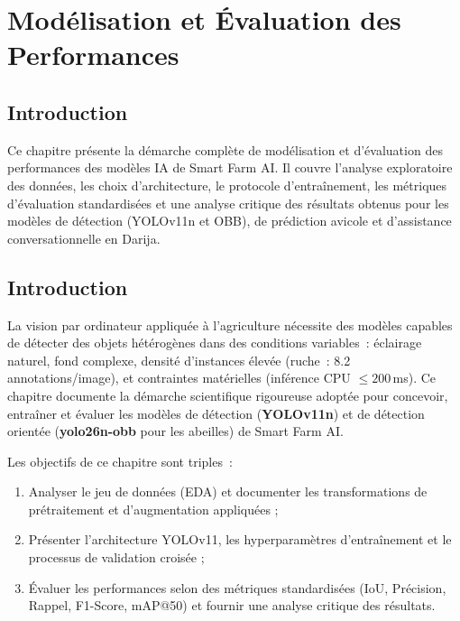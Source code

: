 \chapter{Modélisation et Évaluation des Performances}

\section*{Introduction}

Ce chapitre présente la démarche complète de modélisation et d'évaluation des
performances des modèles IA de Smart Farm AI. Il couvre l'analyse exploratoire
des données, les choix d'architecture, le protocole d'entraînement, les métriques
d'évaluation standardisées et une analyse critique des résultats obtenus pour
les modèles de détection (YOLOv11n et OBB), de prédiction avicole et d'assistance
conversationnelle en Darija.

\section{Introduction}

La vision par ordinateur appliquée à l'agriculture nécessite des modèles capables
de détecter des objets hétérogènes dans des conditions variables~:
éclairage naturel, fond complexe, densité d'instances élevée (ruche~: 8.2 annotations/image),
et contraintes matérielles (inférence CPU $\leq 200$\,ms). Ce chapitre documente
la démarche scientifique rigoureuse adoptée pour concevoir, entraîner et évaluer
les modèles de détection (\textbf{YOLOv11n}) et de détection orientée (\textbf{yolo26n-obb}
pour les abeilles) de Smart Farm AI.

Les objectifs de ce chapitre sont triples~:
\begin{enumerate}
  \item Analyser le jeu de données (EDA) et documenter les transformations de
        prétraitement et d'augmentation appliquées ;
  \item Présenter l'architecture YOLOv11, les hyperparamètres d'entraînement et
        le processus de validation croisée ;
  \item Évaluer les performances selon des métriques standardisées (IoU, Précision,
        Rappel, F1-Score, mAP@50) et fournir une analyse critique des résultats.
\end{enumerate}

